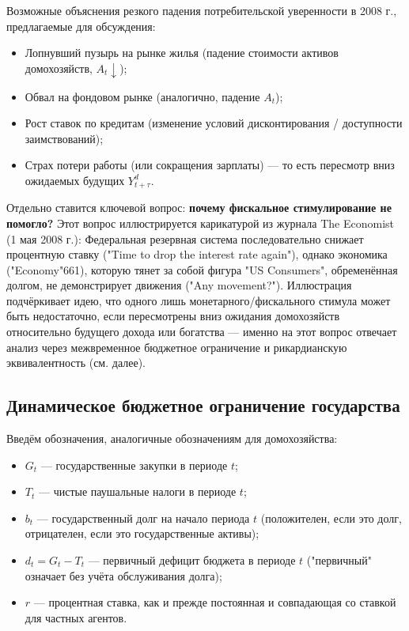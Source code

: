 \documentclass[10pt,a4paper]{article}
\begin{document}
Возможные объяснения резкого падения потребительской уверенности в 2008 г., предлагаемые для обсуждения:
\begin{itemize}
\item Лопнувший пузырь на рынке жилья (падение стоимости активов домохозяйств, $A_t\downarrow$);
\item Обвал на фондовом рынке (аналогично, падение $A_t$);
\item Рост ставок по кредитам (изменение условий дисконтирования / доступности заимствований);
\item Страх потери работы (или сокращения зарплаты) — то есть пересмотр вниз ожидаемых будущих $Y_{t+\tau}^d$.
\end{itemize}
 
Отдельно ставится ключевой вопрос: \textbf{почему фискальное стимулирование не помогло?} Этот вопрос иллюстрируется карикатурой из журнала The Economist (1 мая 2008 г.): Федеральная резервная система последовательно снижает процентную ставку ("Time to drop the interest rate again"), однако экономика ("Economy"661), которую тянет за собой фигура "US Consumers", обременённая долгом, не демонстрирует движения ("Any movement?"). Иллюстрация подчёркивает идею, что одного лишь монетарного/фискального стимула может быть недостаточно, если пересмотрены вниз ожидания домохозяйств относительно будущего дохода или богатства — именно на этот вопрос отвечает анализ через межвременное бюджетное ограничение и рикардианскую эквивалентность (см. далее).
 
\subsection{Динамическое бюджетное ограничение государства}
 
Введём обозначения, аналогичные обозначениям для домохозяйства:
\begin{itemize}
\item $G_t$ — государственные закупки в периоде $t$;
\item $T_t$ — чистые паушальные налоги в периоде $t$;
\item $b_t$ — государственный долг на начало периода $t$ (положителен, если это долг, отрицателен, если это государственные активы);
\item $d_t = G_t - T_t$ — первичный дефицит бюджета в периоде $t$ ("первичный" означает без учёта обслуживания долга);
\item $r$ — процентная ставка, как и прежде постоянная и совпадающая со ставкой для частных агентов.
\end{itemize}
 
\end{document}
